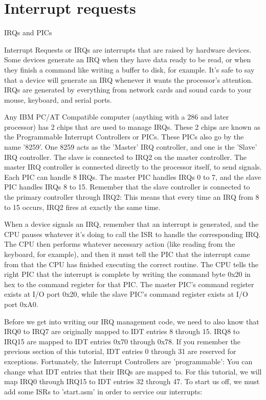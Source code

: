 \documentclass[11pt]{article}
\begin{document}
\section { Interrupt requests }

IRQs and PICs

Interrupt Requests or IRQs are interrupts that are raised by hardware devices. Some devices generate an IRQ when they have data ready to be read, or when they finish a command like writing a buffer to disk, for example. It's safe to say that a device will generate an IRQ whenever it wants the processor's attention. IRQs are generated by everything from network cards and sound cards to your mouse, keyboard, and serial ports.

Any IBM PC/AT Compatible computer (anything with a 286 and later processor) has 2 chips that are used to manage IRQs. These 2 chips are known as the Programmable Interrupt Controllers or PICs. These PICs also go by the name '8259'. One 8259 acts as the 'Master' IRQ controller, and one is the 'Slave' IRQ controller. The slave is connected to IRQ2 on the master controller. The master IRQ controller is connected directly to the processor itself, to send signals. Each PIC can handle 8 IRQs. The master PIC handles IRQs 0 to 7, and the slave PIC handles IRQs 8 to 15. Remember that the slave controller is connected to the primary controller through IRQ2: This means that every time an IRQ from 8 to 15 occurs, IRQ2 fires at exactly the same time.

When a device signals an IRQ, remember that an interrupt is generated, and the CPU pauses whatever it's doing to call the ISR to handle the corresponding IRQ. The CPU then performs whatever necessary action (like reading from the keyboard, for example), and then it must tell the PIC that the interrupt came from that the CPU has finished executing the correct routine. The CPU tells the right PIC that the interrupt is complete by writing the command byte 0x20 in hex to the command register for that PIC. The master PIC's command register exists at I/O port 0x20, while the slave PIC's command register exists at I/O port 0xA0.

Before we get into writing our IRQ management code, we need to also know that IRQ0 to IRQ7 are originally mapped to IDT entries 8 through 15. IRQ8 to IRQ15 are mapped to IDT entries 0x70 through 0x78. If you remember the previous section of this tutorial, IDT entries 0 through 31 are reserved for exceptions. Fortunately, the Interrupt Controllers are 'programmable': You can change what IDT entries that their IRQs are mapped to. For this tutorial, we will map IRQ0 through IRQ15 to IDT entries 32 through 47. To start us off, we must add some ISRs to 'start.asm' in order to service our interrupts:
\end{document}
